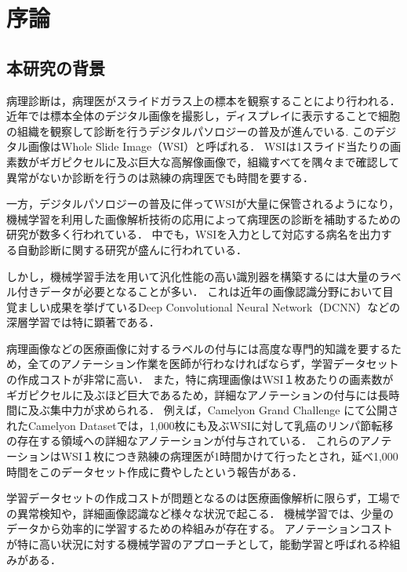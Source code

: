 \chapter{序論}

\section{本研究の背景}

病理診断は，病理医がスライドガラス上の標本を観察することにより行われる．
近年では標本全体のデジタル画像を撮影し，ディスプレイに表示することで細胞の組織を観察して診断を行うデジタルパソロジーの普及が進んでいる\cite{pantanowitz2010digital}.
このデジタル画像はWhole Slide Image（WSI）と呼ばれる．
WSIは1スライド当たりの画素数がギガピクセルに及ぶ巨大な高解像画像で，組織すべてを隅々まで確認して異常がないか診断を行うのは熟練の病理医でも時間を要する．

一方，デジタルパソロジーの普及に伴ってWSIが大量に保管されるようになり，機械学習を利用した画像解析技術の応用によって病理医の診断を補助するための研究が数多く行われている\cite{gurcan2009histopathological, komuraishikawa, litjens2017survey}．
中でも，WSIを入力として対応する病名を出力する自動診断に関する研究が盛んに行われている\cite{doyle2008automated,dundar2011computerized}．

しかし，機械学習手法を用いて汎化性能の高い識別器を構築するには大量のラベル付きデータが必要となることが多い．
これは近年の画像認識分野において目覚ましい成果を挙げているDeep Convolutional Neural Network（DCNN）などの深層学習では特に顕著である．

病理画像などの医療画像に対するラベルの付与には高度な専門的知識を要するため，全てのアノテーション作業を医師が行わなければならず，学習データセットの作成コストが非常に高い．
また，特に病理画像はWSI１枚あたりの画素数がギガピクセルに及ぶほど巨大であるため，詳細なアノテーションの付与には長時間に及ぶ集中力が求められる．
例えば，Camelyon Grand Challenge \cite{Camelyon17}にて公開されたCamelyon Datasetでは，1,000枚にも及ぶWSIに対して乳癌のリンパ節転移の存在する領域への詳細なアノテーションが付与されている．
これらのアノテーションはWSI１枚につき熟練の病理医が1時間かけて行ったとされ，延べ1,000時間をこのデータセット作成に費やしたという報告がある．

学習データセットの作成コストが問題となるのは医療画像解析に限らず，工場での異常検知や，詳細画像認識など様々な状況で起こる．
機械学習では、少量のデータから効率的に学習するための枠組みが存在する。
アノテーションコストが特に高い状況に対する機械学習のアプローチとして，能動学習\cite{settles2010active}と呼ばれる枠組みがある．

